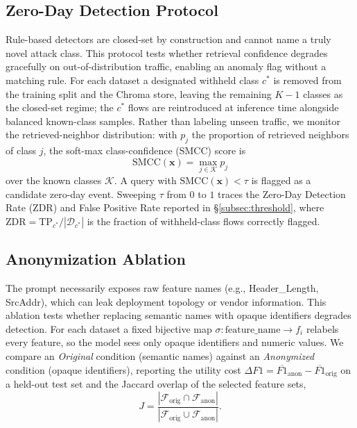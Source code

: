 \subsection{Zero-Day Detection Protocol}
\label{subsec:zeroday}

Rule-based detectors are closed-set by construction and cannot name a truly
novel attack class. This protocol tests whether retrieval confidence degrades
gracefully on out-of-distribution traffic, enabling an anomaly flag without a
matching rule. For each dataset a designated withheld class $c^{*}$ is removed
from the training split and the Chroma store, leaving the remaining $K-1$
classes as the closed-set regime; the $c^{*}$ flows are reintroduced at
inference time alongside balanced known-class samples. Rather than labeling
unseen traffic, we monitor the retrieved-neighbor distribution: with $p_j$ the
proportion of retrieved neighbors of class $j$, the soft-max class-confidence
(SMCC) score is
\[
  \mathrm{SMCC}(\mathbf{x}) = \max_{j \in \mathcal{K}} p_j
\]
over the known classes $\mathcal{K}$. A query with
$\mathrm{SMCC}(\mathbf{x}) < \tau$ is flagged as a candidate zero-day event.
Sweeping $\tau$ from $0$ to $1$ traces the Zero-Day Detection Rate (ZDR) and
False Positive Rate reported in \S\ref{subsec:threshold}, where
$\mathrm{ZDR} = \mathrm{TP}_{c^{*}} / |\mathcal{D}_{c^{*}}|$ is the fraction of
withheld-class flows correctly flagged.

\subsection{Anonymization Ablation}
\label{subsec:anon}

The prompt necessarily exposes raw feature names (e.g., Header\_Length,
SrcAddr), which can leak deployment topology or vendor information. This
ablation tests whether replacing semantic names with opaque identifiers
degrades detection. For each dataset a fixed bijective map
$\sigma: \text{feature\_name} \to f_i$ relabels every feature, so the model
sees only opaque identifiers and numeric values. We compare an \emph{Original}
condition (semantic names) against an \emph{Anonymized} condition (opaque
identifiers), reporting the utility cost
$\Delta F1 = \overline{F1}_{\text{anon}} - \overline{F1}_{\text{orig}}$ on a
held-out test set and the Jaccard overlap of the selected feature sets,
\[
  J = \frac{\left| \mathcal{F}_{\text{orig}} \cap \mathcal{F}_{\text{anon}} \right|}
           {\left| \mathcal{F}_{\text{orig}} \cup \mathcal{F}_{\text{anon}} \right|} .
\]

